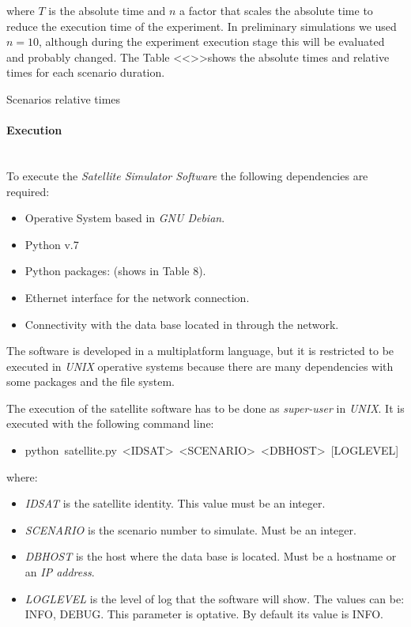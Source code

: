 where $T$ is the absolute time and $n$ a factor that scales the absolute time to reduce the execution time of the experiment. In preliminary simulations we used $n=10$, although during the experiment execution stage this will be evaluated and probably changed. The Table <<>>shows the absolute times and relative times for each scenario duration.


\begin{table}[hp]
  \centering
  {\small
  
  }
  \caption{Scenarios relative times}
  \label{table:sss-scenario-relative-time}
\end{table}


\paragraph{Execution}
\label{par:sat-simulator-execution}~\\

To execute the \emph{Satellite Simulator Software} the following dependencies are
required:
\begin{itemize}
\item Operative System based in \emph{GNU Debian}.
\item Python v.7
\item Python packages: (shows in Table 8).
\item Ethernet interface for the network connection.
\item Connectivity with the data base located in \bonfire through the network.
\end{itemize}
The \satss software is developed in a multiplatform language, but it is restricted to be executed in \emph{UNIX} operative systems because there are many dependencies with some packages and the file system.

The execution of the satellite software has to be done as \emph{super-user} in
\emph{UNIX}. It is executed with the following command line:
\begin{itemize}
\item python~satellite.py~<IDSAT>~<SCENARIO>~<DBHOST>~[LOGLEVEL]
\end{itemize}

where:
\begin{itemize}
\item \emph{IDSAT} is the satellite identity. This value must be an integer. 
\item \emph{SCENARIO} is the scenario number to simulate. Must be an integer.
\item \emph{DBHOST} is the host where the data base is located. Must be a hostname or an \emph{IP address}.
\item \emph{LOGLEVEL} is the level of log that the software will show. The values can be: INFO, DEBUG. This parameter is optative. By default its value is INFO. 
\end{itemize}

